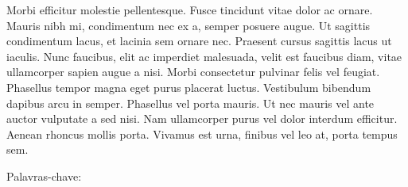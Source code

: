 Morbi efficitur molestie pellentesque. Fusce tincidunt vitae dolor ac ornare. Mauris nibh mi, condimentum nec ex a, semper posuere augue. Ut sagittis condimentum lacus, et lacinia sem ornare nec. Praesent cursus sagittis lacus ut iaculis. Nunc faucibus, elit ac imperdiet malesuada, velit est faucibus diam, vitae ullamcorper sapien augue a nisi. Morbi consectetur pulvinar felis vel feugiat. Phasellus tempor magna eget purus placerat luctus. Vestibulum bibendum dapibus arcu in semper. Phasellus vel porta mauris. Ut nec mauris vel ante auctor vulputate a sed nisi. Nam ullamcorper purus vel dolor interdum efficitur. Aenean rhoncus mollis porta. Vivamus est urna, finibus vel leo at, porta tempus sem.   

\noindent Palavras-chave: 
